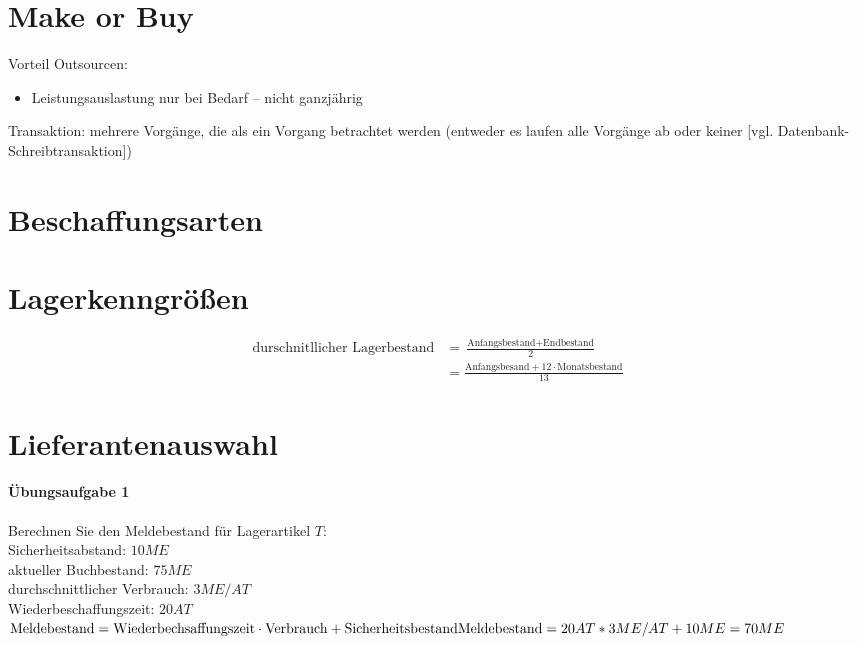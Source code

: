 \section{Make or Buy}
Vorteil Outsourcen:
\begin{itemize}
\item Leistungsauslastung nur bei Bedarf -- nicht ganzjährig
\end{itemize}
Transaktion: mehrere Vorgänge, die als ein Vorgang betrachtet werden (entweder es laufen alle Vorgänge ab oder keiner [vgl. Datenbank-Schreibtransaktion])
\section{Beschaffungsarten}
\section{Lagerkenngrößen}
\begin{align*}
\text{durschnitllicher Lagerbestand} &=\frac{\text{Anfangsbestand}+\text{Endbestand}}{2}\\
&= \frac{\text{Anfangsbesand}+12 \cdot \text{Monatsbestand}}{13}
\end{align*}
\section{Lieferantenauswahl}
\paragraph{Übungsaufgabe 1} Berechnen Sie den Meldebestand für Lagerartikel $T$:\\
Sicherheitsabstand: $10ME$\\
aktueller Buchbestand: $75ME$\\
durchschnittlicher Verbrauch: $3ME/AT$\\
Wiederbeschaffungszeit: $20AT$\bigskip\\
$\text{Meldebestand} = \text{Wiederbechsaffungszeit}\cdot \text{Verbrauch}+\text{Sicherheitsbestand}\\
\text{Meldebestand}=20AT*3ME/AT+10ME=70ME $
